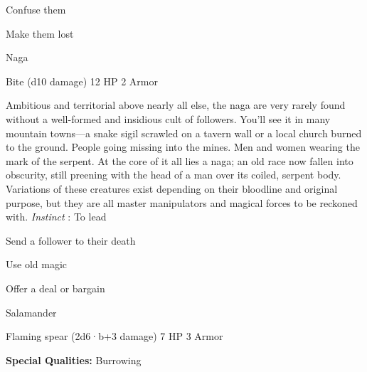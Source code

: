 \startitemize[1,packed]
         
\item Confuse them

         
\item Make them lost

       
\stopitemize
       
\startMonsterName
Naga	 
\stopMonsterName
       

Bite (d10 damage)	12 HP	2 Armor

       


       
\startMonsterDescription
Ambitious and territorial above nearly all else, the naga are very rarely found without a well-formed and insidious cult of followers. You’ll see it in many mountain towns—a snake sigil scrawled on a tavern wall or a local church burned to the ground. People going missing into the mines. Men and women wearing the mark of the serpent. At the core of it all lies a naga; an old race now fallen into obscurity, still preening with the head of a man over its coiled, serpent body. Variations of these creatures exist depending on their bloodline and original purpose, but they are all master manipulators and magical forces to be reckoned with. {\em Instinct} : To lead
\stopMonsterDescription
       
\startitemize[1,packed]
         
\item Send a follower to their death

         
\item Use old magic

         
\item Offer a deal or bargain

       
\stopitemize
       
\startMonsterName
Salamander	 
\stopMonsterName
       

Flaming spear (2d6·b+3 damage)	7 HP	3 Armor

       


       
\startMonsterQualities
         {\bf Special Qualities:}  Burrowing
\stopMonsterQualities
       
